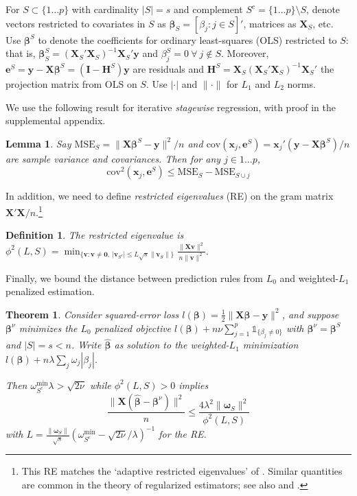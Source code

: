 \documentclass[12pt]{article}
\newtheorem{theorem}{\sc Theorem}[section]
\newtheorem{definition}{\sc Definition}[section]
\newtheorem{lemma}{\sc Lemma}[section]
\newcommand{\bs}[1]{\boldsymbol{#1}}
\newcommand{\mr}[1]{\mathrm{#1}}
\newcommand{\bm}[1]{\mathbf{#1}}
\newcommand{\ds}[1]{\mathds{#1}}
\begin{document}
 For  $S \subset \{1\ldots p\}$ with cardinality $|S|=s$ and complement $S^c =
\{1\ldots p\}\setminus S$, denote vectors restricted to covariates in $S$ as
$\bm{\beta}_S = [\beta_j:j\in S]'$, matrices as $\bm{X}_S$, etc.  Use
$\bs{\beta}^S$ to denote the coefficients for ordinary least-squares (OLS)
restricted to $S$: that is, $\bs{\beta}^S_S =
(\bm{X}_S'\bm{X}_S)^{-1}\bm{X}_S'\bm{y}$ and $\beta^{S}_j = 0~\forall~j\notin
S$.  Moreover, $\bm{e}^S = \bm{y}-\bm{X}\bs{\beta}^S =
(\bm{I}-\bm{H}^S)\bm{y}$ are residuals and $\bm{H}^S =
\bm{X}_S(\bm{X}_S'\bm{X}_S)^{-1}\bm{X}_S'$ the projection matrix from OLS on $S$.  
Use $|\cdot|$ and $\|\cdot\|$ for $L_1$ and $L_2$ norms.

We use the following result for iterative \textit{stagewise} regression, with proof in the supplemental appendix. 
\begin{lemma}\label{SSElemma}
Say $\mr{MSE}_S = \|\bm{X}\bs{\beta}^S-\bm{y}\|^2/n$ and 
$\mr{cov}(\bs{x}_j,\bm{e}^S) = \bs{x}_j'(\bm{y}-\bm{X}\bs{\beta}^S)/n$ are sample variance and covariances.  Then for any $j \in 1\ldots p$, 
\[
\mr{cov}^2(\bs{x}_j,\bm{e}^S) \leq \mr{MSE}_S - \mr{MSE}_{S\cup j}
\]
\end{lemma}

In addition, we need to define {\it restricted eigenvalues} (RE) on the gram matrix $\bm{X}'\bm{X}/n$.\footnote{
  This  RE  matches the `adaptive restricted eigenvalues' of \cite{buhlmann_statistics_2011}.  
Similar quantities are common in the theory of regularized estimators; see also
\cite{raskutti_restricted_2010} and  \cite{bickel_simultaneous_2009}.}

  
\begin{definition}\label{redef}
The restricted eigenvalue is
$
\phi^2(L,S) = \min_{\{\bm{v}: \bm{v}\neq \bm{0},~|\bm{v}_{S^c}| \leq L\sqrt{s}\|\bm{v}_S\|\}}\frac{\|\bm{X}\bm{v}\|^2}{n\|\bm{v}\|^2}$.
\end{definition}

Finally,  we bound the distance between prediction rules
from $L_0$ and weighted-$L_1$ penalized estimation.  

\begin{theorem} \label{thm:sparseapprox}  Consider squared-error loss
$l(\bs{\beta}) =
\frac{1}{2}\|\bm{X}\bs{\beta}-\bm{y}\|^2$, and suppose $\bs{\beta}^{\nu}$ minimizes the $L_0$ penalized objective $l(\bs{\beta}) + n\nu\sum_{j=1}^p\ds{1}_{\{\beta_j\neq0\}}$ with $\bs{\beta}^\nu = \bs{\beta}^S$ and $|S|=s<n$.   
Write $\bs{\hat\beta}$ as solution to the weighted-$L_1$ minimization $l(\bs{\beta}) + n\lambda\sum_j\omega_j|\beta_j|$. 

Then  
$\omega^{\mr{min}}_{S^c}\lambda > \sqrt{2\nu}$ while $\phi^2(L,S) > 0$ implies
\begin{equation} \label{sparseineq}
\frac{\|\bm{X}(\bs{\hat\beta}-\bs{\beta}^\nu)\|^2}{n}\leq
\frac{4\lambda^2 \|\bs{\omega}_S\|^2}{\phi^2(L, S)}
\end{equation} 
with 
 $L = \frac{\|\bs{\omega}_S\|}{\sqrt{s}}\left(\omega^{\mr{min}}_{S^c}-\sqrt{2\nu}/\lambda\right)^{-1}$ for the RE.
\end{theorem}
\end{document}
